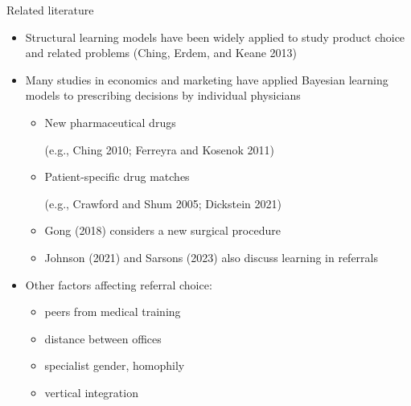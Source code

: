 \documentclass[slides, aspectratio=169]{beamer}
\newcommand{\bit}{\begin{itemize}}
\newcommand{\eit}{\end{itemize}}
\begin{document}
\begin{frame}{Related literature \ \hyperlink{approach}{} \ \hyperlink{summary}{}}
\label{literature}
\begin{itemize}

    \item Structural learning models have been widely applied to study product choice and related problems (Ching, Erdem, and Keane 2013)
    \medskip %

    \item Many studies in economics and marketing have applied Bayesian learning models to prescribing decisions by individual physicians
    \bit
        \item New pharmaceutical drugs \\
        \parbox{\linewidth}{\footnotesize (e.g., Ching 2010; Ferreyra and Kosenok 2011)}
        \item Patient-specific drug matches \\
        \parbox{\linewidth}{\footnotesize (e.g., Crawford and Shum 2005; Dickstein 2021)}
        \item Gong (2018) considers a new surgical procedure
        \item Johnson (2021) and Sarsons (2023) also discuss learning in referrals
    \eit

    \medskip %

    \item Other factors affecting referral choice:
    \bit
        \item peers from medical training
        \item distance between offices
        \item specialist gender, homophily 
        \item vertical integration
    \eit

\end{itemize}
\end{frame}

\end{document}
